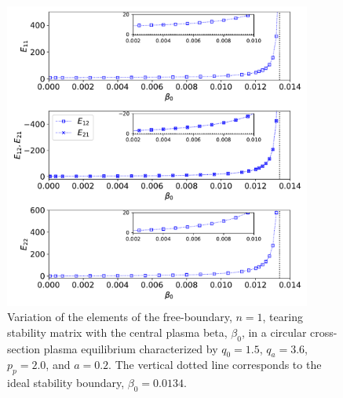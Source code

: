 \documentclass[12pt,prb,aps]{revtex4-1}
\begin{document}
\begin{figure}
\centerline{\includegraphics[width=0.9\textwidth]{Fig6.pdf}}
\caption{Variation of the elements of the free-boundary, $n=1$, tearing stability matrix with the central plasma beta, $\beta_0$, in a circular cross-section plasma equilibrium  characterized by $q_0=1.5$, $q_a= 3.6$, $p_p=2.0$, and
$a=0.2$. The vertical dotted line corresponds to the ideal stability boundary, $\beta_0=0.0134$. \label{fig6}}
\end{figure}
\end{document}
